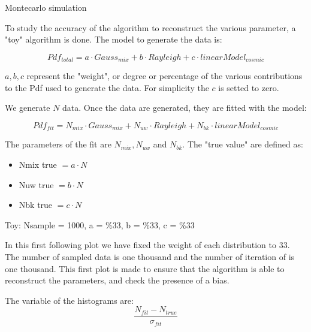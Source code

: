 \documentclass[9pt]{beamer}
\begin{document}
\begin{frame}{Montecarlo simulation}

To study the accuracy of the algorithm to reconstruct the various parameter, a "toy" algorithm is done. The model to generate the data is:

\begin{equation}
Pdf_{total} = a \cdot Gauss_{mix} + b \cdot Rayleigh + c \cdot linearModel_{cosmic} 
\end{equation}

$a,b,c$ represent the "weight", or degree or percentage of the various contributions to the Pdf used to generate the data. For simplicity the $c$ is setted to zero. 

We generate $N$ data. Once the data are generated, they are fitted with the model:

\begin{equation}
Pdf_{fit} = N_{mix} \cdot Gauss_{mix} + N_{uw} \cdot Rayleigh + N_{bk} \cdot linearModel_{cosmic}
\end{equation}

The parameters of the fit are $N_{mix}, N_{uw}$ and $N_{bk}$. The "true value" are defined as:

\begin{itemize}
\centering
\item Nmix true $= a \cdot N$
\item Nuw true  $= b \cdot N$
\item Nbk true  $= c \cdot N$
\end{itemize} 
\end{frame}

\begin{frame} {Toy: Nsample = 1000, a = $ \%33$, b = $\%33$, c = $\%33$}

In this first following plot we have fixed the weight of each distribution to $33$. The number of sampled data is one thousand and the number of iteration of is one thousand. This first plot is made to ensure that the algorithm is able to reconstruct the parameters, and check the presence of a bias.

The variable of the histograms are:
\begin{equation}
\dfrac{N_{fit} - N_{true}}{\sigma_{fit}}
\end{equation}
\end{frame}
\end{document}
